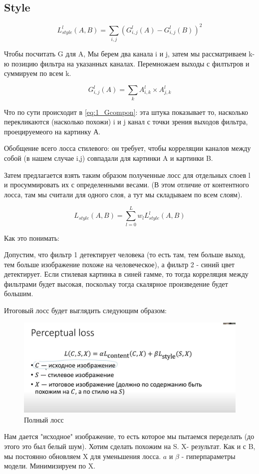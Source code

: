 		\subsection{Style}
		
		
			\begin{equation}
	    L^{l}_{style}(A,B) = \sum_{i,j} (G^{l}_{i,j}(A) -G^{l}_{i,j}(B))^{2}
	    \label{eq:1_styletloss}
	\end{equation}
	
	Чтобы посчитать G для A, Мы берем два канала i и j, затем мы рассматриваем k-ю позицию фильтра  на указанных каналах. Перемножаем выходы с филтьтров и суммируем по всем k.
	
	\begin{equation}
	G^{l}_{i,j} (A) = \sum_{k} A^{l}_{i,k} \times  A^{l}_{j,k}
	   \label{eq:1_Gcompon}
	\end{equation}
	
	
	Что по сути происходит в \ref{eq:1_Gcompon}: эта штука показывает то, насколько перекликаются (насколько похожи) i и j канал с точки зрения выходов фильтра, проецируемеого на картинку А. 
	
	Обобщение всего лосса стилевого: он требует, чтобы корреляции каналов между собой (в нашем случае i,j) совпадали для картинки A и картинки B. 
	
	Затем предлагается взять таким образом полученные лосс для отдельных слоев l и просуммировать их с определенными весами. (В этом отличие от контентного лосса, там мы считали для одного слоя, а тут мы складываем по всем слоям). 
	
	
	
			\begin{equation}
	    L_{style}(A,B) = \sum^{L}_{l=0} w_l L^{l}_{style}(A,B)
	    \label{eq:1_styletloss}
	\end{equation}
	
	Как это понимать: 
	
	Допустим, что фильтр 1 детектирует человека (то есть там, тем больше выход, тем больше изображение похоже на человеческое), а фильтр 2 - синий цвет детектирует. Если стилевая картинка в синей гамме, то тогда корреляция между фильтрами будет высокая, поскольку тогда скалярное произведение будет большим. 
	
	Итоговый лосс будет выглядить следующим образом:
	
		\begin{figure}[H]
\centering
\includegraphics[width=0.7\linewidth]{1_finalloss.jpg}
\caption{Полный лосс}
\label{fig:1_finalloss}
\end{figure}


Нам дается "исходное" изображение, то есть которое мы пытаемся переделать (до этого это был белый шум). Хотим сделать похожим на S. X- результат. Как и с B, мы постоянно обновляем X для уменьшения лосса. $a$ и $\beta$ - гиперпараметры модели.  Минимизируем по X.  
	
